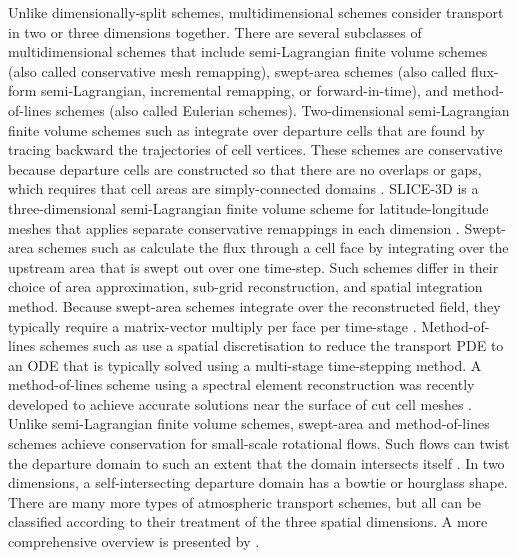 Unlike dimensionally-split schemes, multidimensional schemes consider transport in two or three dimensions together.
There are several subclasses of multidimensional schemes that include
semi-Lagrangian finite volume schemes (also called conservative mesh remapping),
swept-area schemes (also called flux-form semi-Lagrangian, incremental remapping, or forward-in-time),
and method-of-lines schemes (also called Eulerian schemes).
Two-dimensional semi-Lagrangian finite volume schemes such as \citep{iske-kaeser2004,lauritzen2010} integrate over departure cells that are found by tracing backward the trajectories of cell vertices.  These schemes are conservative because departure cells are constructed so that there are no overlaps or gaps, which requires that cell areas are simply-connected domains \citep{lauritzen2011book}.
SLICE-3D is a three-dimensional semi-Lagrangian finite volume scheme for latitude-longitude meshes that applies separate conservative remappings in each dimension \citep{zerroukat-allen2012}.
Swept-area schemes such as \citep{lashley2002,skamarock-menchaca2010,lauritzen2011,thuburn2014} calculate the flux through a cell face by integrating over the upstream area that is swept out over one time-step.  Such schemes differ in their choice of area approximation, sub-grid reconstruction, and spatial integration method.
Because swept-area schemes integrate over the reconstructed field, they typically require a matrix-vector multiply per face per time-stage \citep{thuburn2014,skamarock-menchaca2010}.
Method-of-lines schemes such as \citep{weller2009,skamarock-gassmann2011} use a spatial discretisation to reduce the transport PDE to an ODE that is typically solved using a multi-stage time-stepping method.
A method-of-lines scheme using a spectral element reconstruction was recently developed to achieve accurate solutions near the surface of cut cell meshes \citep{steppeler-klemp2017}.
Unlike semi-Lagrangian finite volume schemes, swept-area and method-of-lines schemes achieve conservation for small-scale rotational flows.
Such flows can twist the departure domain to such an extent that the domain intersects itself \citep{lauritzen2011}.  In two dimensions, a self-intersecting departure domain has a bowtie or hourglass shape.
There are many more types of atmospheric transport schemes, but all can be classified according to their treatment of the three spatial dimensions.  A more comprehensive overview is presented by \citet{lauritzen2014}.

